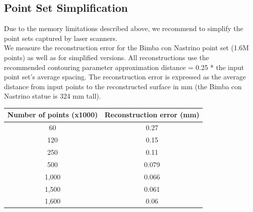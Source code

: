 \subsection{Point Set Simplification}

Due to the memory limitations described above, we recommend to simplify the point sets captured by laser scanners.\\
We measure the reconstruction error for the Bimba con Nastrino point set (1.6M points) as well as for simplified versions. All reconstructions use the recommended contouring parameter approximation distance = 0.25 * the input point set's average spacing.
The reconstruction error is expressed as the average distance from input points to the reconstructed surface in mm (the Bimba con Nastrino statue is 324 mm tall).

\begin{tabular}{|c|c|}
  \hline
  Number of points (x1000) & Reconstruction error (mm) \\
  \hline
  60                         & 0.27 \\
  120                        & 0.15 \\
  250                        & 0.11 \\
  500                        & 0.079 \\
  1,000                       & 0.066 \\
  1,500                       & 0.061 \\
  1,600                       & 0.06 \\
  \hline
\end{tabular}

